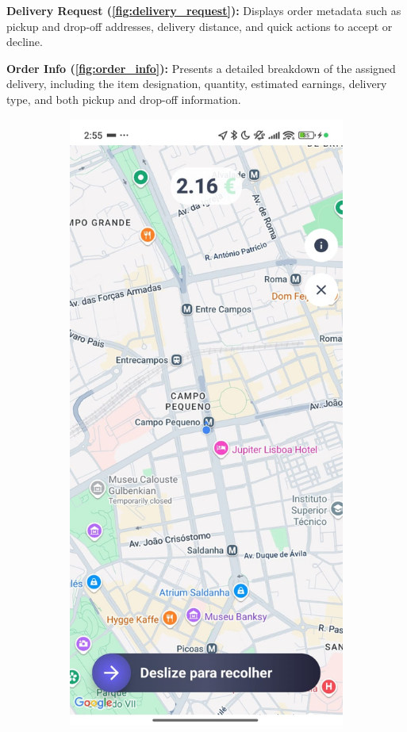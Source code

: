 \noindent\textbf{Delivery Request (\ref{fig:delivery_request}):}  
Displays order metadata such as pickup and drop-off addresses, delivery distance, and quick actions to accept or decline.

\noindent\textbf{Order Info (\ref{fig:order_info}):}  
Presents a detailed breakdown of the assigned delivery, including the item designation, quantity, estimated earnings, delivery type, and both pickup and drop-off information.

\begin{figure}[H]
    \centering
    \begin{subfigure}[b]{0.48\textwidth}
        \centering
        \includegraphics[width=\textwidth]{images/pickup_order_screen.jpeg}

\end{subfigure}
\end{figure}
